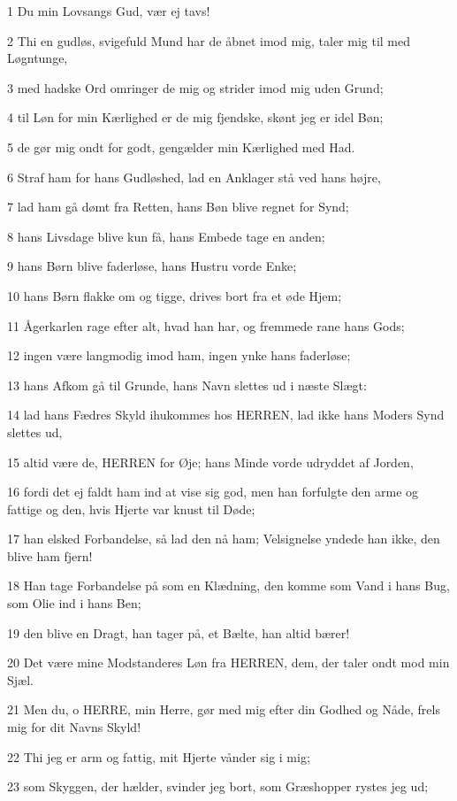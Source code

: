 \par 1 Du min Lovsangs Gud, vær ej tavs!
\par 2 Thi en gudløs, svigefuld Mund har de åbnet imod mig, taler mig til med Løgntunge,
\par 3 med hadske Ord omringer de mig og strider imod mig uden Grund;
\par 4 til Løn for min Kærlighed er de mig fjendske, skønt jeg er idel Bøn;
\par 5 de gør mig ondt for godt, gengælder min Kærlighed med Had.
\par 6 Straf ham for hans Gudløshed, lad en Anklager stå ved hans højre,
\par 7 lad ham gå dømt fra Retten, hans Bøn blive regnet for Synd;
\par 8 hans Livsdage blive kun få, hans Embede tage en anden;
\par 9 hans Børn blive faderløse, hans Hustru vorde Enke;
\par 10 hans Børn flakke om og tigge, drives bort fra et øde Hjem;
\par 11 Ågerkarlen rage efter alt, hvad han har, og fremmede rane hans Gods;
\par 12 ingen være langmodig imod ham, ingen ynke hans faderløse;
\par 13 hans Afkom gå til Grunde, hans Navn slettes ud i næste Slægt:
\par 14 lad hans Fædres Skyld ihukommes hos HERREN, lad ikke hans Moders Synd slettes ud,
\par 15 altid være de, HERREN for Øje; hans Minde vorde udryddet af Jorden,
\par 16 fordi det ej faldt ham ind at vise sig god, men han forfulgte den arme og fattige og den, hvis Hjerte var knust til Døde;
\par 17 han elsked Forbandelse, så lad den nå ham; Velsignelse yndede han ikke, den blive ham fjern!
\par 18 Han tage Forbandelse på som en Klædning, den komme som Vand i hans Bug, som Olie ind i hans Ben;
\par 19 den blive en Dragt, han tager på, et Bælte, han altid bærer!
\par 20 Det være mine Modstanderes Løn fra HERREN, dem, der taler ondt mod min Sjæl.
\par 21 Men du, o HERRE, min Herre, gør med mig efter din Godhed og Nåde, frels mig for dit Navns Skyld!
\par 22 Thi jeg er arm og fattig, mit Hjerte vånder sig i mig;
\par 23 som Skyggen, der hælder, svinder jeg bort, som Græshopper rystes jeg ud;
